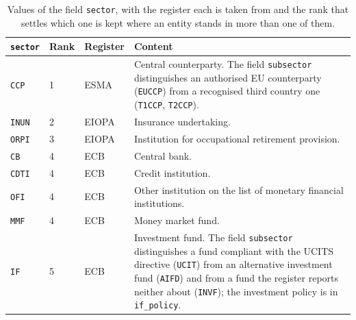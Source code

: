 \begin{table}[h]
	\centering
	\begin{tabular}{l l l p{6.2cm}}
		\hline
		\texttt{sector} & Rank & Register & Content \\
		\hline
		\verb|CCP|  & 1 & ESMA   & \raggedright Central counterparty. The field \texttt{subsector} distinguishes an authorised EU counterparty (\verb|EUCCP|) from a recognised third country one (\verb|T1CCP|, \verb|T2CCP|). \tabularnewline
		\verb|INUN| & 2 & EIOPA  & Insurance undertaking. \\
		\verb|ORPI| & 3 & EIOPA  & Institution for occupational retirement provision. \\
		\verb|CB|   & 4 & ECB    & Central bank. \\
		\verb|CDTI| & 4 & ECB    & Credit institution. \\
		\verb|OFI|  & 4 & ECB    & Other institution on the list of monetary financial institutions. \\
		\verb|MMF|  & 4 & ECB    & Money market fund. \\
		\verb|IF|   & 5 & ECB    & \raggedright Investment fund. The field \texttt{subsector} distinguishes a fund compliant with the UCITS directive (\verb|UCIT|) from an alternative investment fund (\verb|AIFD|) and from a fund the register reports neither about (\verb|INVF|); the investment policy is in \texttt{if\_policy}. \tabularnewline
		\hline
	\end{tabular}
	\caption{Values of the field \texttt{sector}, with the register each is taken from and the rank that settles which one is kept where an entity stands in more than one of them.\label{tab:entitymasterdata-sector}}
\end{table}

